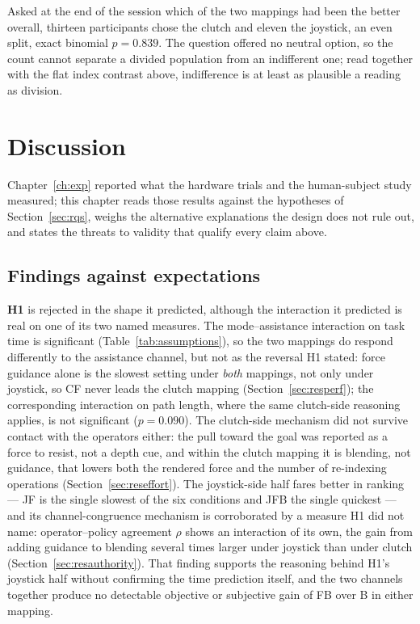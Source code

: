 \documentclass[12pt,a4paper,twoside,openright]{report}
\begin{document}
Asked at the end of the session which of the two mappings had been the better overall, thirteen participants chose the clutch and eleven the joystick, an even split, exact binomial $p = 0.839$. The question offered no neutral option, so the count cannot separate a divided population from an indifferent one; read together with the flat index contrast above, indifference is at least as plausible a reading as division.

\chapter{Discussion}
\label{ch:discussion}

Chapter~\ref{ch:exp} reported what the hardware trials and the human-subject study measured; this chapter reads those results against the hypotheses of Section~\ref{sec:rqs}, weighs the alternative explanations the design does not rule out, and states the threats to validity that qualify every claim above.

\section{Findings against expectations}
\label{sec:discussion-expectations}

\textbf{H1} is rejected in the shape it predicted, although the interaction it predicted is real on one of its two named measures. The mode--assistance interaction on task time is significant (Table~\ref{tab:assumptions}), so the two mappings do respond differently to the assistance channel, but not as the reversal H1 stated: force guidance alone is the slowest setting under \emph{both} mappings, not only under joystick, so CF never leads the clutch mapping (Section~\ref{sec:resperf}); the corresponding interaction on path length, where the same clutch-side reasoning applies, is not significant ($p=0.090$). The clutch-side mechanism did not survive contact with the operators either: the pull toward the goal was reported as a force to resist, not a depth cue, and within the clutch mapping it is blending, not guidance, that lowers both the rendered force and the number of re-indexing operations (Section~\ref{sec:reseffort}). The joystick-side half fares better in ranking --- JF is the single slowest of the six conditions and JFB the single quickest --- and its channel-congruence mechanism is corroborated by a measure H1 did not name: operator--policy agreement $\rho$ shows an interaction of its own, the gain from adding guidance to blending several times larger under joystick than under clutch (Section~\ref{sec:resauthority}). That finding supports the reasoning behind H1's joystick half without confirming the time prediction itself, and the two channels together produce no detectable objective or subjective gain of FB over B in either mapping.
\end{document}
